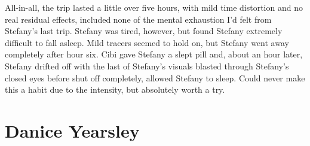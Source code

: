 \documentclass[12pt]{book}
\begin{document}
All-in-all, the trip lasted a little over five hours, with mild time distortion and no real residual effects, included none of the mental exhaustion I'd felt from Stefany's last trip. Stefany was tired, however, but found Stefany extremely difficult to fall asleep. Mild tracers seemed to hold on, but Stefany went away completely after hour six. Cibi gave Stefany a slept pill and, about an hour later, Stefany drifted off with the last of Stefany's visuals blasted through Stefany's closed eyes before shut off completely, allowed Stefany to sleep. Could never make this a habit due to the intensity, but absolutely worth a try.






\chapter{Danice Yearsley}
\end{document}
